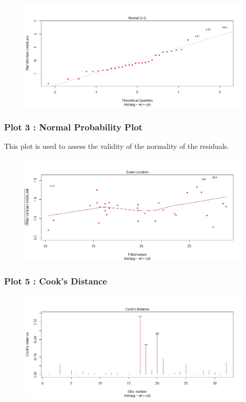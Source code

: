 \documentclass[12pt, a4paper]{article}
\theoremstyle{plain}
\theoremstyle{definition}
\theoremstyle{remark}
\begin{document}
\newpage
\begin{figure}[h!]
\centering
\includegraphics[width=0.9\linewidth]{./mtcarsDiagPlot2}

\label{mtcarsDiagPlot2}
\end{figure}

\subsubsection{Plot 3 : Normal Probability Plot}
This plot is used to assess the validity of the normality of the residuals.
\begin{figure}[h!]
\centering
\includegraphics[width=0.9\linewidth]{./mtcarsDiagPlot3}

\label{mtcarsDiagPlot3}
\end{figure}

\newpage
\subsubsection{Plot 5 :  Cook's Distance}
\begin{figure}[h!]
\centering
\includegraphics[width=0.9\linewidth]{./mtcarsDiagPlot4}

\label{mtcarsDiagPlot4}
\end{figure}
\end{document}
